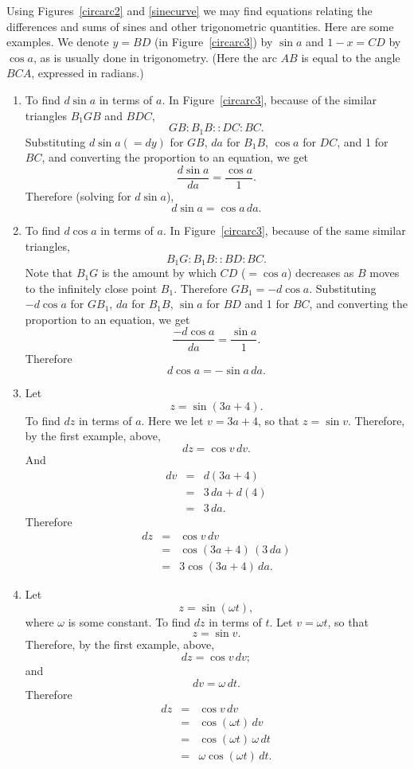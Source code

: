 \documentclass[twoside,openright]{article}
\begin{document}
Using Figures~\ref{circarc2} and \ref{sinecurve}
we may find equations relating the differences and sums of sines and other trigonometric quantities.  Here are some examples.  We denote $y=BD$ (in Figure~\ref{circarc3}) by $\sin a$ and $1-x = CD$ by $\cos a$, as is usually done in trigonometry.  (Here the arc $AB$ is equal to the angle $BCA$, expressed in radians.)
\begin{enumerate}

\item \label{dsin}To find $d\sin a$ in terms of $a$.  In Figure~\ref{circarc3}, because of the similar triangles $B_1GB$ and $BDC$,
$$ GB \!:\! B_1B::  DC \!:\! BC.$$
Substituting $d\sin a (=dy)$ for $GB$, $da$ for $B_1B$, $\cos a$ for $DC$, and 1 for $BC$, and converting the proportion to an equation, we get
$$\frac{d\sin a}{da} = \frac{\cos a}{1}.$$
Therefore (solving for $d\sin a$), 
$$d\sin a = \cos a\,da.$$

\item To find $d\cos a$ in terms of $a$.  In Figure~\ref{circarc3}, because of the same similar triangles,
$$B_1G \!:\! B_1B :: BD \!:\! BC.$$
Note that $B_1G$ is the amount by which  $CD$ ($= \cos a$) decreases as $B$ moves to the infinitely close point $B_1$.  Therefore $GB_1 = -d\cos a$.  Substituting $-d\cos a$ for $GB_1$, $da$ for $B_1B$, $\sin a$ for $BD$ and 1 for $BC$, and converting the proportion to an equation, we get
$$\frac{-d\cos a}{da} = \frac{\sin a}{1}.$$
Therefore
$$d\cos a = -\sin a\,da.$$

\item \label{trigex3} Let
$$z = \sin(3a+ 4).$$
To find $dz$ in terms of $a$.  Here we let $v= 3a+4$, so that $z = \sin v$.
Therefore, by the first example, above,
$$dz = \cos v\,dv.$$
And
\setlength{\jot}{1.5ex}
\begin{eqnarray*}
dv & = & d(3a+4)\\
& = & 3\,da + d(4) \\
& = & 3\,da.
\end{eqnarray*}
Therefore 
\begin{eqnarray*}
dz & = & \cos v \,dv\\
& = & \cos (3a + 4) \,(3\,da)\\
& =& 3\cos (3a+4) \,da.
\end{eqnarray*}

\item Let 
$$z = \sin(\omega t),$$
where $\omega$ is some constant.  To find $dz$ in terms of $t$.  Let $v = \omega t$, so that 
$$z = \sin v.$$
Therefore, by the first example, above,
$$dz = \cos v\,dv;$$
and
$$dv = \omega\,dt.$$
Therefore
\begin{eqnarray*}
dz & = & \cos v\,dv\\
& = & \cos (\omega t)\,dv\\
& = & \cos(\omega t)\,\omega\,dt\\
& = & \omega \cos(\omega t)\,dt.
\end{eqnarray*}



\end{enumerate}
\end{document}
